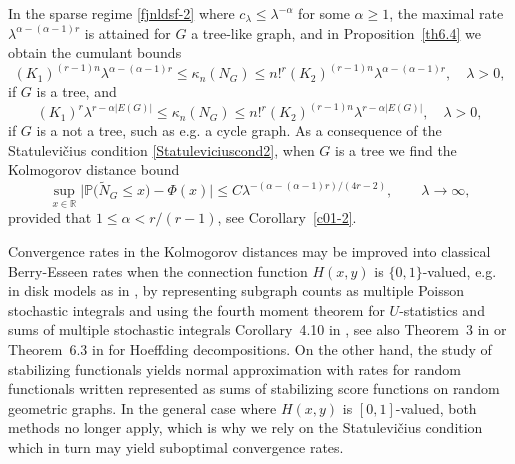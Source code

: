 \documentclass[bj,authoryear,noshowframe]{imsart}
\theoremstyle{plain}
\theoremstyle{remark}
\def\P{\mathbb{P}}
\def\real{{\mathord{\mathbb R}}}
\begin{document}
 In the sparse regime \eqref{fjnldsf-2} where
 $ c_\lambda \leq \lambda^{-\alpha}$ for some $\alpha \geq 1$,
 the maximal rate $\lambda^{
 \alpha         -(\alpha - 1)r 
          }$
 is attained for $G$ a tree-like graph, and
 in Proposition~\ref{th6.4} we obtain the cumulant bounds %
$$ 
    \nonumber %
            (K_1)^{(r-1)n}
    \lambda^{
 \alpha     -(\alpha - 1)r 
      }
     \leq 
  \kappa_n(N_G)
  \leq
  n!^r
  (K_2)^{(r-1)n}
  \lambda^{
   \alpha -(\alpha - 1)r 
    } 
  , \quad \lambda > 0, 
$$ 
  if $G$ is a tree, and
$$ 
  \nonumber %
    (K_1)^r 
  \lambda^{r-\alpha |E(G)|}
  \leq 
  \kappa_n(N_G)
  \leq
    n!^r
    (K_2)^{(r-1)n}
    \lambda^{r-\alpha |E(G)|}, \quad \lambda >0, 
$$ 
  if $G$ is a not a tree, such as e.g. a cycle graph.
  As a consequence of the {Statulevi\v{c}ius condition}
  \eqref{Statuleviciuscond2}, 
 when $G$ is a tree
 we find the Kolmogorov distance bound %
$$  
\sup_{x\in \real}
\big| \P \big( \widetilde{N}_G \leq x \big) - \Phi (x) \big| \leq
 C \lambda^{
    - (
\alpha    -(\alpha - 1)r 
        ) / ( 4r - 2) }
, \qquad \lambda \to \infty, 
$$ 
 provided that $1 \leq \alpha < r/(r-1)$, 
 see Corollary~\ref{c01-2}. 
 
 
 Convergence rates in the Kolmogorov distances may be improved
 into classical Berry-Esseen rates when 
 the connection function $H(x,y)$ is $\{0,1\}$-valued, e.g. in disk models
 as in \cite{privaultkhops}, 
 by representing subgraph counts as multiple Poisson stochastic integrals
 and using the fourth moment theorem for $U$-statistics and sums of
 multiple stochastic integrals Corollary~4.10 in \cite{eichelsbacher}, 
 see also Theorem~3 in \cite{lachieze-rey} 
 or Theorem~6.3 in \cite{PS4} for Hoeffding decompositions.
 On the other hand, the study of stabilizing functionals \cite{penrose05,lachiezerey4} yields normal approximation with rates for random functionals written represented as sums of stabilizing score functions on random geometric graphs. In the general case where $H(x,y)$ is $[0,1]$-valued, both methods no longer apply, which is why we rely on the {Statulevi\v{c}ius condition} which in turn may yield suboptimal convergence rates. 
 
\end{document}
